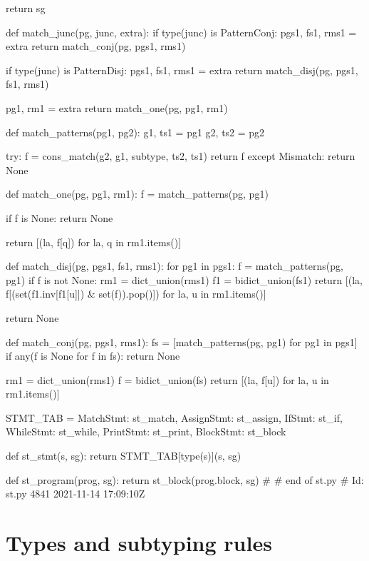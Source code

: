 \begin{dispPy}
    return sg

def match_junc(pg, junc, extra):
    if type(junc) is PatternConj:
        pgs1, fs1, rms1 = extra
        return match_conj(pg, pgs1, rms1)

    if type(junc) is PatternDisj:
        pgs1, fs1, rms1 = extra
        return match_disj(pg, pgs1, fs1, rms1)

    pg1, rm1 = extra
    return match_one(pg, pg1, rm1)

def match_patterns(pg1, pg2):
    g1, ts1 = pg1
    g2, ts2 = pg2

    try:
        f = cons_match(g2, g1, subtype, ts2, ts1)
        return f
    except Mismatch:
        return None

def match_one(pg, pg1, rm1):
    f = match_patterns(pg, pg1)

    if f is None:
        return None

    return [(la, f[q]) for la, q in rm1.items()]

def match_disj(pg, pgs1, fs1, rms1):
    for pg1 in pgs1:
        f = match_patterns(pg, pg1)
        if f is not None:
            rm1 = dict_union(rms1)
            f1 = bidict_union(fs1)
            return [(la, f[(set(f1.inv[f1[u]]) & set(f)).pop()]) for la, u in rm1.items()]

    return None

def match_conj(pg, pgs1, rms1):
    fs = [match_patterns(pg, pg1) for pg1 in pgs1]
    if any(f is None for f in fs):
        return None

    rm1 = dict_union(rms1)
    f = bidict_union(fs)
    return [(la, f[u]) for la, u in rm1.items()]

STMT_TAB = {
    MatchStmt: st_match,
    AssignStmt: st_assign,
    IfStmt: st_if,
    WhileStmt: st_while,
    PrintStmt: st_print,
    BlockStmt: st_block}

def st_stmt(s, sg):
    return STMT_TAB[type(s)](s, sg)

def st_program(prog, sg):
    return st_block(prog.block, sg)
#
# end of st.py
# Id: st.py 4841 2021-11-14 17:09:10Z 
\end{dispPy}

\section{Types and subtyping rules}

